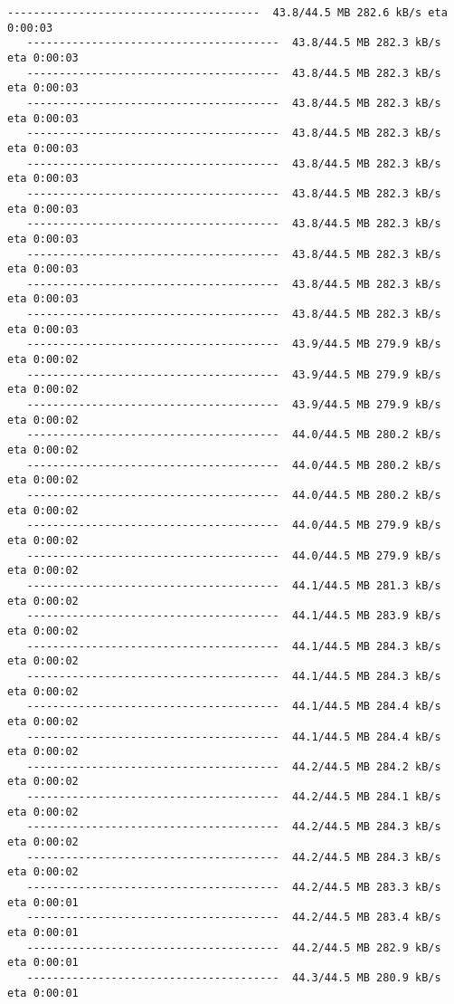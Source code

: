 \documentclass[11pt]{article}
\begin{document}
\begin{Verbatim}[commandchars=\\\{\}]
   ---------------------------------------  43.8/44.5 MB 282.6 kB/s eta 0:00:03
   ---------------------------------------  43.8/44.5 MB 282.3 kB/s eta 0:00:03
   ---------------------------------------  43.8/44.5 MB 282.3 kB/s eta 0:00:03
   ---------------------------------------  43.8/44.5 MB 282.3 kB/s eta 0:00:03
   ---------------------------------------  43.8/44.5 MB 282.3 kB/s eta 0:00:03
   ---------------------------------------  43.8/44.5 MB 282.3 kB/s eta 0:00:03
   ---------------------------------------  43.8/44.5 MB 282.3 kB/s eta 0:00:03
   ---------------------------------------  43.8/44.5 MB 282.3 kB/s eta 0:00:03
   ---------------------------------------  43.8/44.5 MB 282.3 kB/s eta 0:00:03
   ---------------------------------------  43.8/44.5 MB 282.3 kB/s eta 0:00:03
   ---------------------------------------  43.8/44.5 MB 282.3 kB/s eta 0:00:03
   ---------------------------------------  43.9/44.5 MB 279.9 kB/s eta 0:00:02
   ---------------------------------------  43.9/44.5 MB 279.9 kB/s eta 0:00:02
   ---------------------------------------  43.9/44.5 MB 279.9 kB/s eta 0:00:02
   ---------------------------------------  44.0/44.5 MB 280.2 kB/s eta 0:00:02
   ---------------------------------------  44.0/44.5 MB 280.2 kB/s eta 0:00:02
   ---------------------------------------  44.0/44.5 MB 280.2 kB/s eta 0:00:02
   ---------------------------------------  44.0/44.5 MB 279.9 kB/s eta 0:00:02
   ---------------------------------------  44.0/44.5 MB 279.9 kB/s eta 0:00:02
   ---------------------------------------  44.1/44.5 MB 281.3 kB/s eta 0:00:02
   ---------------------------------------  44.1/44.5 MB 283.9 kB/s eta 0:00:02
   ---------------------------------------  44.1/44.5 MB 284.3 kB/s eta 0:00:02
   ---------------------------------------  44.1/44.5 MB 284.3 kB/s eta 0:00:02
   ---------------------------------------  44.1/44.5 MB 284.4 kB/s eta 0:00:02
   ---------------------------------------  44.1/44.5 MB 284.4 kB/s eta 0:00:02
   ---------------------------------------  44.2/44.5 MB 284.2 kB/s eta 0:00:02
   ---------------------------------------  44.2/44.5 MB 284.1 kB/s eta 0:00:02
   ---------------------------------------  44.2/44.5 MB 284.3 kB/s eta 0:00:02
   ---------------------------------------  44.2/44.5 MB 284.3 kB/s eta 0:00:02
   ---------------------------------------  44.2/44.5 MB 283.3 kB/s eta 0:00:01
   ---------------------------------------  44.2/44.5 MB 283.4 kB/s eta 0:00:01
   ---------------------------------------  44.2/44.5 MB 282.9 kB/s eta 0:00:01
   ---------------------------------------  44.3/44.5 MB 280.9 kB/s eta 0:00:01

\end{Verbatim}
\end{document}
